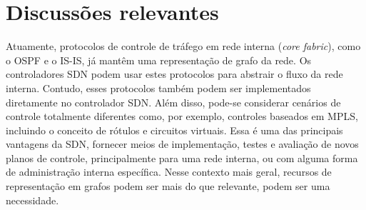 \section{Discussões relevantes}
\label{sec:discussions}

Atuamente, protocolos de controle de tráfego em rede interna (\emph{core fabric}),
como o OSPF e o IS-IS, já mantêm uma representação de grafo da rede.
Os controladores SDN podem usar estes protocolos para abstrair o 
fluxo da rede interna.
Contudo, esses protocolos também podem ser implementados diretamente
no controlador SDN.
Além disso, pode-se considerar cenários de controle totalmente diferentes
como, por exemplo, controles baseados em MPLS, 
incluindo o conceito de rótulos e circuitos virtuais.
Essa é uma das principais vantagens da SDN, fornecer meios de implementação,
testes e avaliação de novos planos de controle, principalmente para 
uma rede interna, ou com alguma forma de administração interna específica.
Nesse contexto mais geral, recursos de representação em grafos podem ser 
mais do que relevante, podem ser uma necessidade.


